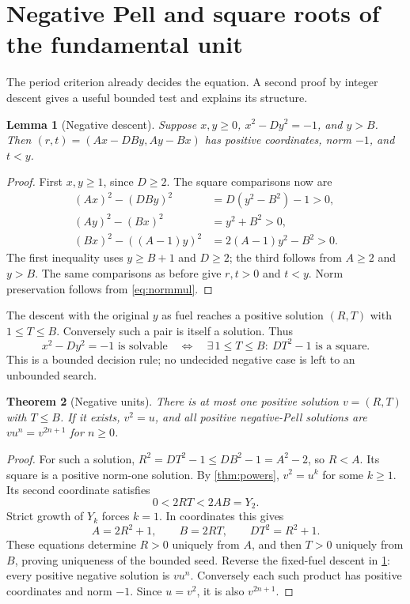 \documentclass[11pt,letterpaper]{article}
\newtheorem{theorem}{Theorem}[section]
\newtheorem{lemma}[theorem]{Lemma}
\theoremstyle{definition}
\begin{document}
\section{Negative Pell and square roots of the fundamental unit}\label{sec:negative}

The period criterion already decides the equation. A second proof by
integer descent gives a useful bounded test and explains its structure.

\begin{lemma}[Negative descent]\label{lem:negdescent}
Suppose $x,y\ge0$, $x^2-Dy^2=-1$, and $y>B$. Then
$(r,t)=(Ax-DBy,Ay-Bx)$ has positive coordinates, norm $-1$, and $t<y$.
\end{lemma}
\begin{proof}
First $x,y\ge1$, since $D\ge2$. The square comparisons now are
\begin{align*}
 (Ax)^2-(DBy)^2&=D(y^2-B^2)-1>0,\\
 (Ay)^2-(Bx)^2&=y^2+B^2>0,\\
 (Bx)^2-((A-1)y)^2&=2(A-1)y^2-B^2>0.
\end{align*}
The first inequality uses $y\ge B+1$ and $D\ge2$; the third follows from
$A\ge2$ and $y>B$. The same comparisons as before give $r,t>0$ and
$t<y$. Norm preservation follows from \eqref{eq:normmul}.
\end{proof}

The descent with the original $y$ as fuel reaches a positive solution
$(R,T)$ with $1\le T\le B$. Conversely such a pair is itself a solution.
Thus
\begin{equation}\label{eq:negativefinite}
 x^2-Dy^2=-1\text{ is solvable}
 \quad\Longleftrightarrow\quad
 \exists\,1\le T\le B:\ DT^2-1\text{ is a square}.
\end{equation}
This is a bounded decision rule; no undecided negative case is left to an
unbounded search.

\begin{theorem}[Negative units]\label{thm:negativeunits}
There is at most one positive solution $v=(R,T)$ with $T\le B$.
If it exists, $v^2=u$, and all positive negative-Pell solutions are
$vu^n=v^{2n+1}$ for $n\ge0$.
\end{theorem}
\begin{proof}
For such a solution,
$R^2=DT^2-1\le DB^2-1=A^2-2$, so $R<A$.
Its square is a positive norm-one solution. By \cref{thm:powers},
$v^2=u^k$ for some $k\ge1$. Its second coordinate satisfies
\[
 0<2RT<2AB=Y_2.
\]
Strict growth of $Y_k$ forces $k=1$. In coordinates this gives
\begin{equation}\label{eq:negativesquare}
 A=2R^2+1,\qquad B=2RT,\qquad DT^2=R^2+1.
\end{equation}
These equations determine $R>0$ uniquely from $A$, and then $T>0$
uniquely from $B$, proving uniqueness of the bounded seed.
Reverse the fixed-fuel descent in \cref{lem:negdescent}: every positive
negative solution is $vu^n$. Conversely each such product has positive
coordinates and norm $-1$. Since $u=v^2$, it is also $v^{2n+1}$.
\end{proof}
\end{document}
